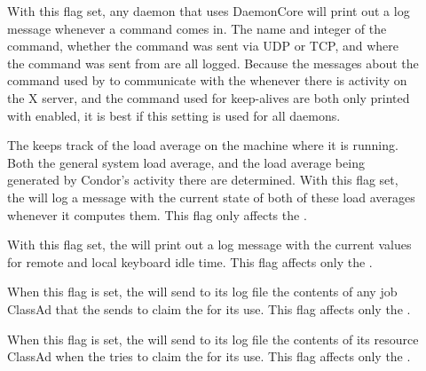 \begin{description}
\begin{description}
\item[] \label{dflag:command}
  With this flag set, any
  daemon that uses DaemonCore will print out a log message
  whenever a command comes in.  The name and integer of the command,
  whether the command was sent via UDP or TCP, and where
  the command was sent from are all logged.  
  Because the messages about the command used by  to
  communicate with the  whenever there is activity on
  the X server, and the command used for keep-alives are both only
  printed with  enabled, it is best if this setting
  is used for all daemons.

\item[] \label{dflag:load}
The  keeps track
  of the load average on the machine where it is running.  Both the
  general system load average, and the load average being generated by
  Condor's activity there are determined.
  With this flag set, the 
  will log a message with the current state of both of these
  load averages whenever it computes them.  This flag only affects the
  .

\item[] \label{dflag:keyboard} 
  With this flag set, the  will print out a log message
  with the current values for remote and local keyboard idle time.
  This flag affects only the .

\item[] \label{dflag:job}
  When this flag is set, the
   will send to its log file the contents of any
  job ClassAd that the  sends to claim the
   for its use.  This flag affects only the
  .
  
\item[] \label{dflag:machine}
  When this flag is set,
  the  will send to its log file the contents of
  its resource ClassAd when the  tries to claim the
   for its use.  This flag affects only the
  .


\end{description}
\end{description}
